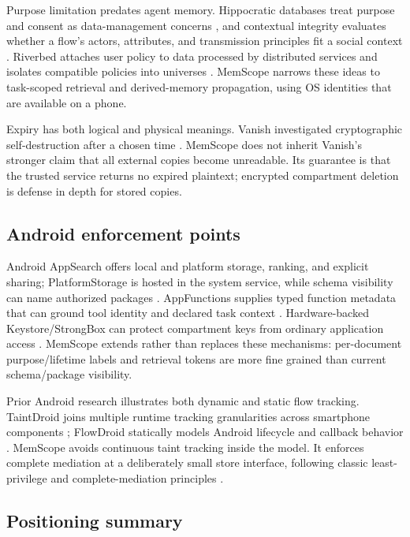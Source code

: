 Purpose limitation predates agent memory. Hippocratic databases treat purpose and consent as data-management concerns \citep{agrawal2002hippocratic}, and contextual integrity evaluates whether a flow's actors, attributes, and transmission principles fit a social context \citep{nissenbaum2010privacy}. Riverbed attaches user policy to data processed by distributed services and isolates compatible policies into universes \citep{wang2019riverbed}. MemScope narrows these ideas to task-scoped retrieval and derived-memory propagation, using OS identities that are available on a phone.

Expiry has both logical and physical meanings. Vanish investigated cryptographic self-destruction after a chosen time \citep{geambasu2009vanish}. MemScope does not inherit Vanish's stronger claim that all external copies become unreadable. Its guarantee is that the trusted service returns no expired plaintext; encrypted compartment deletion is defense in depth for stored copies.

\subsection{Android enforcement points}

Android AppSearch offers local and platform storage, ranking, and explicit sharing; PlatformStorage is hosted in the system service, while schema visibility can name authorized packages \citep{android2026appsearch,android2026visibility}. AppFunctions supplies typed function metadata that can ground tool identity and declared task context \citep{android2026appfunctions}. Hardware-backed Keystore/StrongBox can protect compartment keys from ordinary application access \citep{android2026strongbox}. MemScope extends rather than replaces these mechanisms: per-document purpose/lifetime labels and retrieval tokens are more fine grained than current schema/package visibility.

Prior Android research illustrates both dynamic and static flow tracking. TaintDroid joins multiple runtime tracking granularities across smartphone components \citep{enck2010taintdroid}; FlowDroid statically models Android lifecycle and callback behavior \citep{arzt2014flowdroid}. MemScope avoids continuous taint tracking inside the model. It enforces complete mediation at a deliberately small store interface, following classic least-privilege and complete-mediation principles \citep{saltzer1975protection}.

\subsection{Positioning summary}

